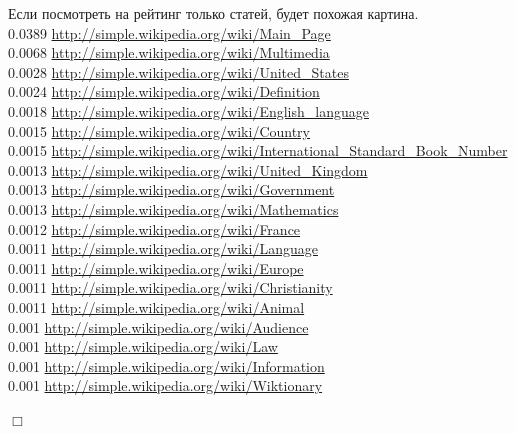 \documentclass[12pt]{article}
\begin{document}
Если посмотреть на рейтинг только статей, будет похожая картина.\\
0.0389 \url{http://simple.wikipedia.org/wiki/Main_Page}\\
0.0068 \url{http://simple.wikipedia.org/wiki/Multimedia}\\
0.0028 \url{http://simple.wikipedia.org/wiki/United_States}\\
0.0024 \url{http://simple.wikipedia.org/wiki/Definition}\\
0.0018 \url{http://simple.wikipedia.org/wiki/English_language}\\
0.0015 \url{http://simple.wikipedia.org/wiki/Country}\\
0.0015 \url{http://simple.wikipedia.org/wiki/International_Standard_Book_Number}\\
0.0013 \url{http://simple.wikipedia.org/wiki/United_Kingdom}\\
0.0013 \url{http://simple.wikipedia.org/wiki/Government}\\
0.0013 \url{http://simple.wikipedia.org/wiki/Mathematics}\\
0.0012 \url{http://simple.wikipedia.org/wiki/France}\\
0.0011 \url{http://simple.wikipedia.org/wiki/Language}\\
0.0011 \url{http://simple.wikipedia.org/wiki/Europe}\\
0.0011 \url{http://simple.wikipedia.org/wiki/Christianity}\\
0.0011 \url{http://simple.wikipedia.org/wiki/Animal}\\
0.001 \url{http://simple.wikipedia.org/wiki/Audience}\\
0.001 \url{http://simple.wikipedia.org/wiki/Law}\\
0.001 \url{http://simple.wikipedia.org/wiki/Information}\\
0.001 \url{http://simple.wikipedia.org/wiki/Wiktionary}\\

\begin{flushright}
$\Box$
\end{flushright}
\end{document}
